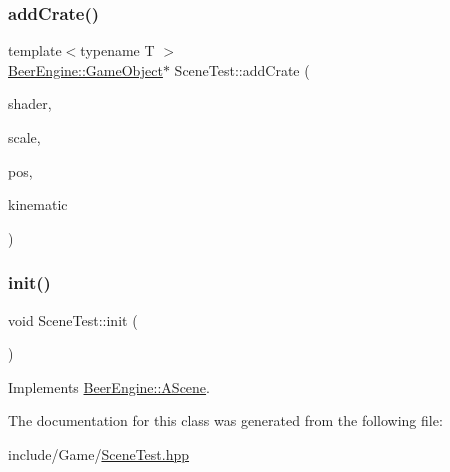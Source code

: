 \subsubsection{\texorpdfstring{add\+Crate()}{addCrate()}}
{\footnotesize\ttfamily template$<$typename T $>$ \\
\mbox{\hyperlink{class_beer_engine_1_1_game_object}{Beer\+Engine\+::\+Game\+Object}}$\ast$ Scene\+Test\+::add\+Crate (\begin{DoxyParamCaption}\item[{\mbox{\hyperlink{class_beer_engine_1_1_graphics_1_1_shader_program}{Beer\+Engine\+::\+Graphics\+::\+Shader\+Program}} $\ast$}]{shader,  }\item[{glm\+::vec3}]{scale,  }\item[{glm\+::vec3}]{pos,  }\item[{\mbox{\hyperlink{namespace_beer_engine_1_1_component_a2cfe279cc309b6420e792597940b8a33}{Beer\+Engine\+::\+Component\+::\+R\+B\+Type}}}]{kinematic }\end{DoxyParamCaption})}

\mbox{\label{class_scene_test_aedded03410798c3705fb3fb028e56ab5}} 
\subsubsection{\texorpdfstring{init()}{init()}}
{\footnotesize\ttfamily void Scene\+Test\+::init (\begin{DoxyParamCaption}\item[{void}]{ }\end{DoxyParamCaption})\hspace{0.3cm}{\ttfamily [virtual]}}



Implements \mbox{\hyperlink{class_beer_engine_1_1_a_scene_a7a55b4e506ae618e6596ae812ad48db0}{Beer\+Engine\+::\+A\+Scene}}.



The documentation for this class was generated from the following file\+:\begin{DoxyCompactItemize}
\item 
include/\+Game/\mbox{\hyperlink{_scene_test_8hpp}{Scene\+Test.\+hpp}}\end{DoxyCompactItemize}
